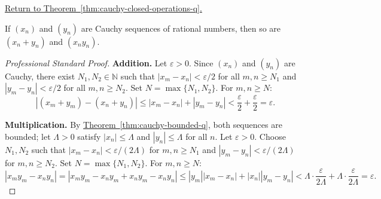 
\newpage
{}
\label{prf:cauchy-closed-operations-q}

\begin{remark*}[Return]
\hyperref[thm:cauchy-closed-operations-q]{Return to Theorem~\ref*{thm:cauchy-closed-operations-q}.}
\end{remark*}

\begin{theorem*}
If $(x_n)$ and $(y_n)$ are Cauchy sequences of rational numbers, then so
are $(x_n + y_n)$ and $(x_n y_n)$.
\end{theorem*}

\begin{proof}[Professional Standard Proof]
\LRAProofBodyStart
\textbf{Addition.}
Let $\varepsilon > 0$.  Since $(x_n)$ and $(y_n)$ are Cauchy, there exist
$N_1, N_2 \in \mathbb{N}$ such that
$|x_m - x_n| < \varepsilon/2$ for all $m,n \geq N_1$ and
$|y_m - y_n| < \varepsilon/2$ for all $m,n \geq N_2$.
Set $N = \max\{N_1, N_2\}$.  For $m, n \geq N$:
\[
|(x_m + y_m) - (x_n + y_n)|
\leq |x_m - x_n| + |y_m - y_n|
< \frac{\varepsilon}{2} + \frac{\varepsilon}{2} = \varepsilon.
\]

\textbf{Multiplication.}
By \hyperref[thm:cauchy-bounded-q]{Theorem~\ref*{thm:cauchy-bounded-q}},
both sequences are bounded; let $\Lambda > 0$ satisfy $|x_n| \leq \Lambda$
and $|y_n| \leq \Lambda$ for all $n$.
Let $\varepsilon > 0$.  Choose $N_1, N_2$ such that
$|x_m - x_n| < \varepsilon/(2\Lambda)$ for $m,n \geq N_1$ and
$|y_m - y_n| < \varepsilon/(2\Lambda)$ for $m,n \geq N_2$.
Set $N = \max\{N_1, N_2\}$.  For $m, n \geq N$:
\[
|x_m y_m - x_n y_n|
= |x_m y_m - x_n y_m + x_n y_m - x_n y_n|
\leq |y_m||x_m - x_n| + |x_n||y_m - y_n|
< \Lambda \cdot \frac{\varepsilon}{2\Lambda} + \Lambda \cdot \frac{\varepsilon}{2\Lambda}
= \varepsilon.
\]
\end{proof}

